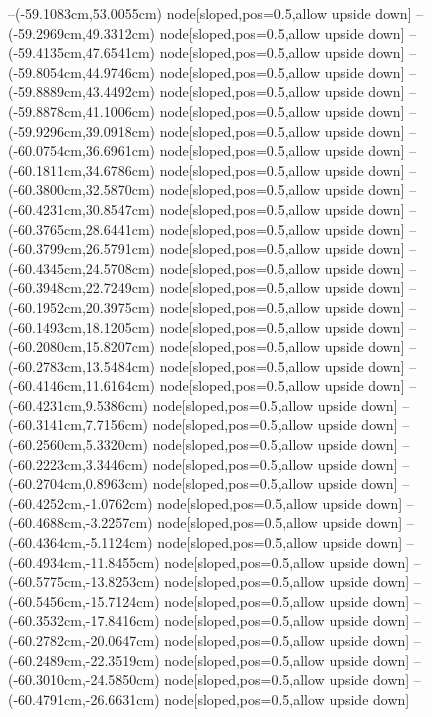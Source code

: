 --(-59.1083cm,53.0055cm) node[sloped,pos=0.5,allow upside down]{\ArrowIn}
--(-59.2969cm,49.3312cm) node[sloped,pos=0.5,allow upside down]{\ArrowIn}
--(-59.4135cm,47.6541cm) node[sloped,pos=0.5,allow upside down]{\ArrowIn}
--(-59.8054cm,44.9746cm) node[sloped,pos=0.5,allow upside down]{\ArrowIn}
--(-59.8889cm,43.4492cm) node[sloped,pos=0.5,allow upside down]{\ArrowIn}
--(-59.8878cm,41.1006cm) node[sloped,pos=0.5,allow upside down]{\ArrowIn}
--(-59.9296cm,39.0918cm) node[sloped,pos=0.5,allow upside down]{\ArrowIn}
--(-60.0754cm,36.6961cm) node[sloped,pos=0.5,allow upside down]{\ArrowIn}
--(-60.1811cm,34.6786cm) node[sloped,pos=0.5,allow upside down]{\ArrowIn}
--(-60.3800cm,32.5870cm) node[sloped,pos=0.5,allow upside down]{\ArrowIn}
--(-60.4231cm,30.8547cm) node[sloped,pos=0.5,allow upside down]{\ArrowIn}
--(-60.3765cm,28.6441cm) node[sloped,pos=0.5,allow upside down]{\ArrowIn}
--(-60.3799cm,26.5791cm) node[sloped,pos=0.5,allow upside down]{\ArrowIn}
--(-60.4345cm,24.5708cm) node[sloped,pos=0.5,allow upside down]{\ArrowIn}
--(-60.3948cm,22.7249cm) node[sloped,pos=0.5,allow upside down]{\ArrowIn}
--(-60.1952cm,20.3975cm) node[sloped,pos=0.5,allow upside down]{\ArrowIn}
--(-60.1493cm,18.1205cm) node[sloped,pos=0.5,allow upside down]{\ArrowIn}
--(-60.2080cm,15.8207cm) node[sloped,pos=0.5,allow upside down]{\ArrowIn}
--(-60.2783cm,13.5484cm) node[sloped,pos=0.5,allow upside down]{\ArrowIn}
--(-60.4146cm,11.6164cm) node[sloped,pos=0.5,allow upside down]{\ArrowIn}
--(-60.4231cm,9.5386cm) node[sloped,pos=0.5,allow upside down]{\ArrowIn}
--(-60.3141cm,7.7156cm) node[sloped,pos=0.5,allow upside down]{\ArrowIn}
--(-60.2560cm,5.3320cm) node[sloped,pos=0.5,allow upside down]{\ArrowIn}
--(-60.2223cm,3.3446cm) node[sloped,pos=0.5,allow upside down]{\ArrowIn}
--(-60.2704cm,0.8963cm) node[sloped,pos=0.5,allow upside down]{\ArrowIn}
--(-60.4252cm,-1.0762cm) node[sloped,pos=0.5,allow upside down]{\ArrowIn}
--(-60.4688cm,-3.2257cm) node[sloped,pos=0.5,allow upside down]{\ArrowIn}
--(-60.4364cm,-5.1124cm) node[sloped,pos=0.5,allow upside down]{\ArrowIn}
--(-60.4934cm,-11.8455cm) node[sloped,pos=0.5,allow upside down]{\ArrowIn}
--(-60.5775cm,-13.8253cm) node[sloped,pos=0.5,allow upside down]{\ArrowIn}
--(-60.5456cm,-15.7124cm) node[sloped,pos=0.5,allow upside down]{\ArrowIn}
--(-60.3532cm,-17.8416cm) node[sloped,pos=0.5,allow upside down]{\ArrowIn}
--(-60.2782cm,-20.0647cm) node[sloped,pos=0.5,allow upside down]{\ArrowIn}
--(-60.2489cm,-22.3519cm) node[sloped,pos=0.5,allow upside down]{\ArrowIn}
--(-60.3010cm,-24.5850cm) node[sloped,pos=0.5,allow upside down]{\ArrowIn}
--(-60.4791cm,-26.6631cm) node[sloped,pos=0.5,allow upside down]{\ArrowIn}
